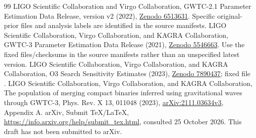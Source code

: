 \begin{thebibliography}{99}
 LIGO Scientific Collaboration and Virgo Collaboration, GWTC-2.1 Parameter Estimation Data Release, version v2 (2022), \href{https://zenodo.org/records/6513631}{Zenodo 6513631}. Specific original-prior files and analysis labels are identified in the source manifests.
 LIGO Scientific Collaboration, Virgo Collaboration, and KAGRA Collaboration, GWTC-3 Parameter Estimation Data Release (2021), \href{https://zenodo.org/records/5546663}{Zenodo 5546663}. Use the fixed files/checksums in the source manifests rather than an unspecified latest version.
 LIGO Scientific Collaboration, Virgo Collaboration, and KAGRA Collaboration, O3 Search Sensitivity Estimates (2023), \href{https://zenodo.org/records/7890437}{Zenodo 7890437}; fixed file .
 LIGO Scientific Collaboration, Virgo Collaboration, and KAGRA Collaboration, The population of merging compact binaries inferred using gravitational waves through GWTC-3, Phys. Rev. X 13, 011048 (2023), \href{https://arxiv.org/abs/2111.03634v3}{arXiv:2111.03634v3}, Appendix A.
 arXiv, Submit TeX/LaTeX, \url{https://info.arxiv.org/help/submit_tex.html}, consulted 25 October 2026. This draft has not been submitted to arXiv.
\end{thebibliography}
